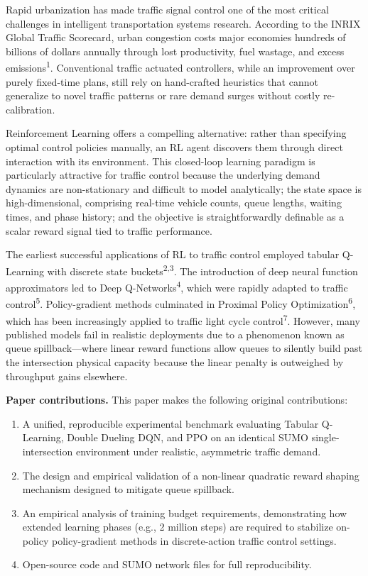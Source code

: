 \documentclass[10pt,a4paper]{article}
\begin{document}
Rapid urbanization has made traffic signal control one of the most critical challenges in intelligent transportation systems research. According to the INRIX Global Traffic Scorecard, urban congestion costs major economies hundreds of billions of dollars annually through lost productivity, fuel wastage, and excess emissions\textsuperscript{1}. Conventional traffic actuated controllers, while an improvement over purely fixed-time plans, still rely on hand-crafted heuristics that cannot generalize to novel traffic patterns or rare demand surges without costly re-calibration.

Reinforcement Learning offers a compelling alternative: rather than specifying optimal control policies manually, an RL agent discovers them through direct interaction with its environment. This closed-loop learning paradigm is particularly attractive for traffic control because the underlying demand dynamics are non-stationary and difficult to model analytically; the state space is high-dimensional, comprising real-time vehicle counts, queue lengths, waiting times, and phase history; and the objective is straightforwardly definable as a scalar reward signal tied to traffic performance.

The earliest successful applications of RL to traffic control employed tabular Q-Learning with discrete state buckets\textsuperscript{2,3}. The introduction of deep neural function approximators led to Deep Q-Networks\textsuperscript{4}, which were rapidly adapted to traffic control\textsuperscript{5}. Policy-gradient methods culminated in Proximal Policy Optimization\textsuperscript{6}, which has been increasingly applied to traffic light cycle control\textsuperscript{7}. However, many published models fail in realistic deployments due to a phenomenon known as queue spillback---where linear reward functions allow queues to silently build past the intersection physical capacity because the linear penalty is outweighed by throughput gains elsewhere.

\textbf{Paper contributions.} This paper makes the following original contributions:
\begin{enumerate}
    \item A unified, reproducible experimental benchmark evaluating Tabular Q-Learning, Double Dueling DQN, and PPO on an identical SUMO single-intersection environment under realistic, asymmetric traffic demand.
    \item The design and empirical validation of a non-linear quadratic reward shaping mechanism designed to mitigate queue spillback.
    \item An empirical analysis of training budget requirements, demonstrating how extended learning phases (e.g., 2 million steps) are required to stabilize on-policy policy-gradient methods in discrete-action traffic control settings.
    \item Open-source code and SUMO network files for full reproducibility.
\end{enumerate}
\end{document}

